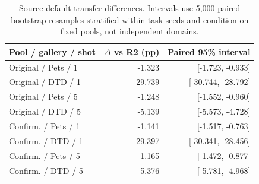 \begin{table}[t]
\centering\small\setlength{\tabcolsep}{3pt}
\begin{tabular}{lrr}
\toprule
Pool / gallery / shot & $\Delta$ vs R2 (pp) & Paired 95\% interval \\ \midrule
Original / Pets / 1 & -1.323 & [-1.723, -0.933] \\
Original / DTD / 1 & -29.739 & [-30.744, -28.792] \\
Original / Pets / 5 & -1.248 & [-1.552, -0.960] \\
Original / DTD / 5 & -5.139 & [-5.573, -4.728] \\
Confirm. / Pets / 1 & -1.141 & [-1.517, -0.763] \\
Confirm. / DTD / 1 & -29.397 & [-30.341, -28.456] \\
Confirm. / Pets / 5 & -1.165 & [-1.472, -0.877] \\
Confirm. / DTD / 5 & -5.376 & [-5.781, -4.968] \\
\bottomrule\end{tabular}
\caption{Source-default transfer differences. Intervals use 5,000 paired bootstrap resamples stratified within task seeds and condition on fixed pools, not independent domains.}\label{tab:paired}
\end{table}
